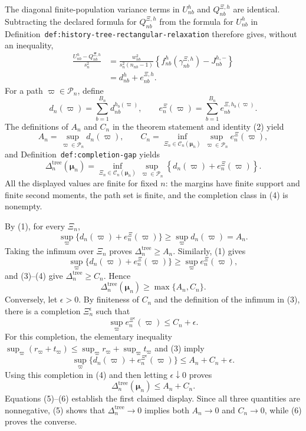 The diagonal finite-population variance terms in \(U_{nb}^{h}\) and \(Q_{nb}^{\Xi,h}\) are identical.  Subtracting the declared formula for \(Q_{nb}^{\Xi,h}\) from the formula for \(U_{nb}^{h}\) in Definition~\texttt{def:history-tree-rectangular-relaxation} therefore gives, without an inequality,
\[
 \begin{aligned}
 \frac{U_{nb}^{h}-Q_{nb}^{\Xi,h}}{s_n^2}
 &=\frac{w_{nb}^2}{s_n^2(n_{nb}-1)}
 \left\{f_{nb}^{h}(\gamma_{nb}^{\Xi,h})-J_{nb}^{h,-}\right\}\\
 &=d_{nb}^{h}+e_{nb}^{\Xi,h}. \tag{2}
 \end{aligned}
\]
For a path \(\varpi\in\mathcal P_n\), define
\[
 d_n(\varpi)=\sum_{b=1}^{B_n}d_{nb}^{h_b(\varpi)},
 \qquad
 e_n^{\Xi}(\varpi)=\sum_{b=1}^{B_n}e_{nb}^{\Xi,h_b(\varpi)}.
\]
The definitions of \(A_n\) and \(C_n\) in the theorem statement and identity (2) yield
\[
 A_n=\sup_{\varpi\in\mathcal P_n}d_n(\varpi),
 \qquad
 C_n=\inf_{\Xi_n\in\mathcal C_n(\boldsymbol\mu_n)}
       \sup_{\varpi\in\mathcal P_n}e_n^{\Xi}(\varpi), \tag{3}
\]
and Definition~\texttt{def:completion-gap} yields
\[
 \Delta_n^{\mathrm{tree}}(\boldsymbol\mu_n)
 =\inf_{\Xi_n\in\mathcal C_n(\boldsymbol\mu_n)}
   \sup_{\varpi\in\mathcal P_n}
   \left\{d_n(\varpi)+e_n^{\Xi}(\varpi)\right\}. \tag{4}
\]
All the displayed values are finite for fixed \(n\): the margins have finite support and finite second moments, the path set is finite, and the completion class in (4) is nonempty.

By (1), for every \(\Xi_n\),
\[
 \sup_{\varpi}\{d_n(\varpi)+e_n^{\Xi}(\varpi)\}
 \ge \sup_{\varpi}d_n(\varpi)=A_n.
\]
Taking the infimum over \(\Xi_n\) proves
\(\Delta_n^{\mathrm{tree}}\ge A_n\).  Similarly, (1) gives
\[
 \sup_{\varpi}\{d_n(\varpi)+e_n^{\Xi}(\varpi)\}
 \ge \sup_{\varpi}e_n^{\Xi}(\varpi),
\]
and (3)--(4) give \(\Delta_n^{\mathrm{tree}}\ge C_n\).  Hence
\[
 \Delta_n^{\mathrm{tree}}(\boldsymbol\mu_n)\ge\max\{A_n,C_n\}. \tag{5}
\]
Conversely, let \(\epsilon>0\).  By finiteness of \(C_n\) and the definition of the infimum in (3), there is a completion \(\Xi_n^{\epsilon}\) such that
\[
 \sup_{\varpi}e_n^{\Xi^{\epsilon}}(\varpi)\le C_n+\epsilon.
\]
For this completion, the elementary inequality \(\sup_{\varpi}(r_{\varpi}+t_{\varpi})\le\sup_{\varpi}r_{\varpi}+\sup_{\varpi}t_{\varpi}\) and (3) imply
\[
 \sup_{\varpi}\{d_n(\varpi)+e_n^{\Xi^{\epsilon}}(\varpi)\}
 \le A_n+C_n+\epsilon.
\]
Using this completion in (4) and then letting \(\epsilon\downarrow0\) proves
\[
 \Delta_n^{\mathrm{tree}}(\boldsymbol\mu_n)\le A_n+C_n. \tag{6}
\]
Equations (5)--(6) establish the first claimed display.  Since all three quantities are nonnegative, (5) shows that \(\Delta_n^{\mathrm{tree}}\to0\) implies both \(A_n\to0\) and \(C_n\to0\), while (6) proves the converse.

